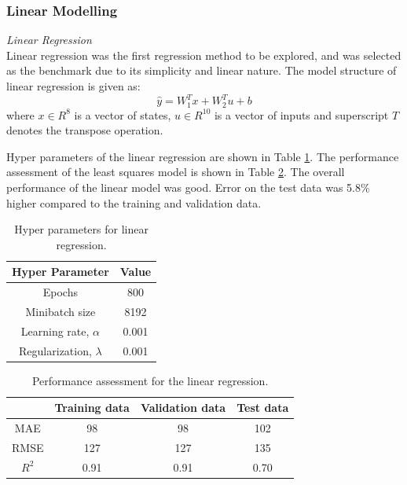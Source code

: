 %
%
\subsubsection{Linear Modelling}
\noindent
\textit{Linear Regression} \\
Linear regression was the first regression method to be explored, and was selected as the benchmark due to its simplicity and linear nature. The model structure of linear regression is given as:
\begin{equation}
    \hat{y} = W_1^Tx + W_2^Tu + b
    \label{eq:08LS}
\end{equation}
where $x \in R^8$ is a vector of states, $u \in R^{10}$ is a vector of inputs and superscript $T$ denotes the transpose operation.

Hyper parameters of the linear regression are shown in Table \ref{tab:08LSHparameters}. The performance assessment of the least squares model is shown in Table \ref{tab:08LSperformance}. The overall performance of the linear model was good. Error on the test data was 5.8\% higher compared to the training and validation data.
\begin{table}[h]
    \centering
    {
    \begin{tabular}{ c | c}
        Hyper Parameter                  &  Value       \\
        \hline
        Epochs                           &  800      \\
        Minibatch size                   &  8192     \\
        Learning rate, $\alpha$          &  0.001    \\
        Regularization, $\lambda$          &  0.001  \\
    \end{tabular}}
    \caption{Hyper parameters for linear regression.}
    \label{tab:08LSHparameters}
\end{table}
\begin{table}[h]
    \centering
    {
    \begin{tabular}{ c | c | c | c}
                             &  Training data    &  Validation data   &    Test data      \\
        \hline
        MAE                  &  98               &    98              &  102     \\
        RMSE                 &  127              &   127              &  135    \\ 
        $R^2$                &  0.91             &   0.91             &  0.70   \\
    \end{tabular}}
    \caption{Performance assessment for the linear regression.}
    \label{tab:08LSperformance}
\end{table}

